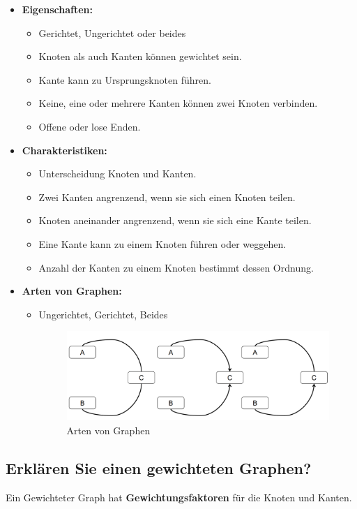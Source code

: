 \begin{itemize}
    \item \textbf{Eigenschaften:}
        \begin{itemize}
            \item Gerichtet, Ungerichtet oder beides
            \item Knoten als auch Kanten können gewichtet sein.
            \item Kante kann zu Ursprungsknoten führen.
            \item Keine, eine oder mehrere Kanten können zwei Knoten verbinden.
            \item Offene oder lose Enden.
        \end{itemize}
    \item \textbf{Charakteristiken:}
        \begin{itemize}
            \item Unterscheidung Knoten und Kanten.
            \item Zwei Kanten angrenzend, wenn sie sich einen Knoten teilen.
            \item Knoten aneinander angrenzend, wenn sie sich eine Kante teilen.
            \item Eine Kante kann zu einem Knoten führen oder weggehen.
            \item Anzahl der Kanten zu einem Knoten bestimmt dessen Ordnung.
        \end{itemize}
    \item \textbf{Arten von Graphen:}
        \begin{itemize}
            \item Ungerichtet, Gerichtet, Beides
            \begin{figure}[H]
                \centering
                \includegraphics[width=0.7\linewidth]{Bilder/Teil3_ArtenGraphen.png}
                \caption{Arten von Graphen}
            \end{figure}
        \end{itemize}
\end{itemize}


\subsection{Erklären Sie einen gewichteten Graphen?}
Ein Gewichteter Graph hat \textbf{Gewichtungsfaktoren} für die Knoten und Kanten.

